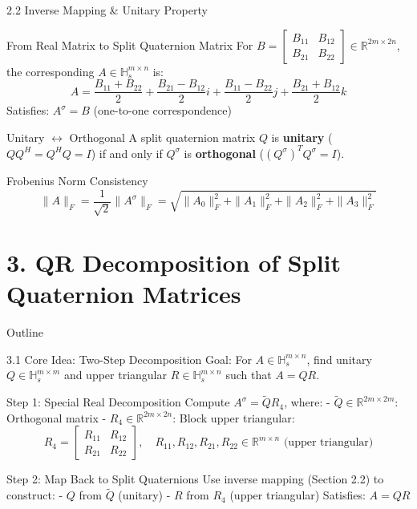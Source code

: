 \documentclass{beamer}
\begin{document}
\begin{frame}{2.2 Inverse Mapping \& Unitary Property}
  \begin{block}{From Real Matrix to Split Quaternion Matrix}
    For $B = \begin{bmatrix} B_{11} & B_{12} \\ B_{21} & B_{22} \end{bmatrix} \in \mathbb{R}^{2m \times 2n}$, the corresponding $A \in \mathbb{H}_s^{m \times n}$ is:
    \[
    A = \frac{B_{11}+B_{22}}{2} + \frac{B_{21}-B_{12}}{2}i + \frac{B_{11}-B_{22}}{2}j + \frac{B_{21}+B_{12}}{2}k
    \]
    Satisfies: $A^\sigma = B$ (one-to-one correspondence)
  \end{block}
  
  \begin{block}{Unitary $\leftrightarrow$ Orthogonal}
    A split quaternion matrix $Q$ is \textbf{unitary} ($QQ^H = Q^HQ = I$) if and only if $Q^\sigma$ is \textbf{orthogonal} ($(Q^\sigma)^T Q^\sigma = I$).
  \end{block}
  
  \begin{block}{Frobenius Norm Consistency}
    \[
    \|A\|_F = \frac{1}{\sqrt{2}}\|A^\sigma\|_F = \sqrt{\|A_0\|_F^2 + \|A_1\|_F^2 + \|A_2\|_F^2 + \|A_3\|_F^2}
    \]
  \end{block}
\end{frame}

\section{3. QR Decomposition of Split Quaternion Matrices}
\begin{frame}{Outline}
  \tableofcontents[sectionstyle=show/shaded, subsectionstyle=show/show/shaded]
\end{frame}

\begin{frame}{3.1 Core Idea: Two-Step Decomposition}
  Goal: For $A \in \mathbb{H}_s^{m \times n}$, find unitary $Q \in \mathbb{H}_s^{m \times m}$ and upper triangular $R \in \mathbb{H}_s^{m \times n}$ such that $A = QR$.
  
  \begin{block}{Step 1: Special Real Decomposition}
    Compute $A^\sigma = \tilde{Q} R_4$, where:
    - $\tilde{Q} \in \mathbb{R}^{2m \times 2m}$: Orthogonal matrix
    - $R_4 \in \mathbb{R}^{2m \times 2n}$: Block upper triangular:
      \[
      R_4 = \begin{bmatrix} R_{11} & R_{12} \\ R_{21} & R_{22} \end{bmatrix}, \quad R_{11},R_{12},R_{21},R_{22} \in \mathbb{R}^{m \times n} \text{ (upper triangular)}
      \]
  \end{block}
  
  \begin{block}{Step 2: Map Back to Split Quaternions}
    Use inverse mapping (Section 2.2) to construct:
    - $Q$ from $\tilde{Q}$ (unitary)
    - $R$ from $R_4$ (upper triangular)
    Satisfies: $A = QR$
  \end{block}
\end{frame}
\end{document}
